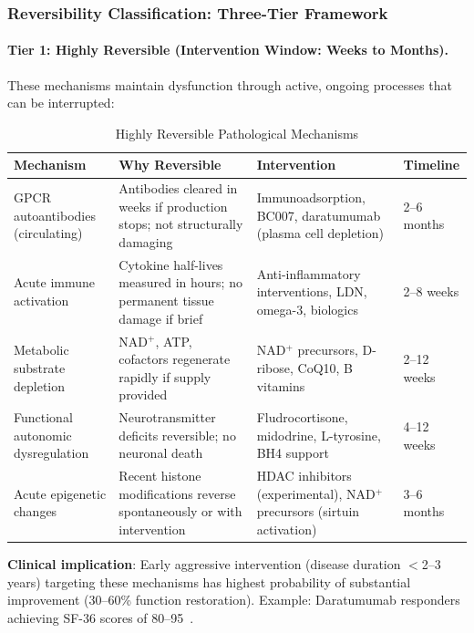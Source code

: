 \subsubsection{Reversibility Classification: Three-Tier Framework}

\paragraph{Tier 1: Highly Reversible (Intervention Window: Weeks to Months).}

These mechanisms maintain dysfunction through active, ongoing processes that can be interrupted:

\begin{table}[htbp]
\centering
\caption{Highly Reversible Pathological Mechanisms}
\label{tab:reversible-tier1}
\small
\begin{tabular}{@{}p{3.5cm}p{4cm}p{4cm}p{2cm}@{}}
\toprule
\textbf{Mechanism} & \textbf{Why Reversible} & \textbf{Intervention} & \textbf{Timeline} \\
\midrule
GPCR autoantibodies (circulating) & Antibodies cleared in weeks if production stops; not structurally damaging & Immunoadsorption, BC007, daratumumab (plasma cell depletion) & 2--6 months \\
\addlinespace
Acute immune activation & Cytokine half-lives measured in hours; no permanent tissue damage if brief & Anti-inflammatory interventions, LDN, omega-3, biologics & 2--8 weeks \\
\addlinespace
Metabolic substrate depletion & NAD$^+$, ATP, cofactors regenerate rapidly if supply provided & NAD$^+$ precursors, D-ribose, CoQ10, B vitamins & 2--12 weeks \\
\addlinespace
Functional autonomic dysregulation & Neurotransmitter deficits reversible; no neuronal death & Fludrocortisone, midodrine, L-tyrosine, BH4 support & 4--12 weeks \\
\addlinespace
Acute epigenetic changes & Recent histone modifications reverse spontaneously or with intervention & HDAC inhibitors (experimental), NAD$^+$ precursors (sirtuin activation) & 3--6 months \\
\bottomrule
\end{tabular}
\par\smallskip
\footnotesize{\textbf{Clinical implication}: Early aggressive intervention (disease duration $<$2--3 years) targeting these mechanisms has highest probability of substantial improvement (30--60\% function restoration). Example: Daratumumab responders achieving SF-36 scores of 80--95~\cite{Fluge2025daratumumab}.}
\end{table}

